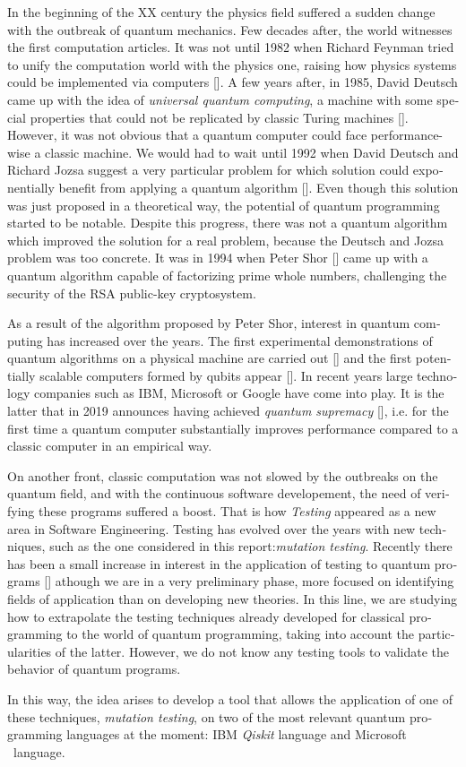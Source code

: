 \begin{otherlanguage}{british}
In the beginning of the XX century the physics field suffered a sudden change with the outbreak of quantum mechanics. Few decades after, the world witnesses the first computation articles. It was not until 1982 when Richard Feynman tried to unify the computation world with the physics one, raising how physics systems could be implemented via computers [\cite{feynman1982simulating}]. A few years after, in 1985, David Deutsch came up with the idea of \textit{universal quantum computing}, a machine with some special properties that could not be replicated by classic Turing machines [\cite{deutsch1985quantum}]. However, it was not obvious that a quantum computer could face performance-wise a classic machine. We would had to wait until 1992 when David Deutsch and Richard Jozsa suggest a very particular problem for which solution could exponentially benefit from applying a quantum algorithm [\cite{deutsch1992rapid}]. Even though this solution was just proposed in a theoretical way, the potential of quantum programming started to be notable. Despite this progress, there was not a quantum algorithm which improved the solution for a real problem, because the Deutsch and  Jozsa problem was too concrete. It was in 1994 when Peter Shor [\cite{shor1994algorithms}] came up with a quantum algorithm capable of factorizing prime whole numbers, challenging the security of the RSA public-key cryptosystem.

As a result of the algorithm proposed by Peter Shor, interest in quantum computing has increased over the years. The first experimental demonstrations of quantum algorithms on a physical machine are carried out [\cite{jones1998implementation}] and the first potentially scalable computers formed by qubits appear [\cite{haffner2005scalable}]. In recent years large technology companies such as IBM, Microsoft or Google have come into play. It is the latter that in 2019 announces having achieved \textit{quantum supremacy} [\cite{arute2019quantum}], i.e. for the first time a quantum computer substantially improves performance compared to a classic computer in an empirical way.

On another front, classic computation was not slowed by the outbreaks on the quantum field, and with the continuous software developement, the need of verifying these programs suffered a boost.
That is how \textit{Testing} appeared as a new area in Software Engineering. Testing has evolved over the years with new techniques, such as the one considered in this report:\textit{mutation testing}. Recently there has been a small increase in interest in the application of testing to quantum programs [\cite{usaolaquantum}] athough we are in a very preliminary phase, more focused on identifying fields of application than on developing new theories. In this line, we are studying how to extrapolate the testing techniques already developed for classical programming to the world of quantum programming, taking into account the particularities of the latter. However, we do not know any testing tools to validate the behavior of quantum programs. 

In this way, the idea arises to develop a tool that allows the application of one of these techniques, \textit{mutation testing}, on two of the most relevant quantum programming languages at the moment: IBM \textit{Qiskit} language and Microsoft \qsh\ language.
\end{otherlanguage}